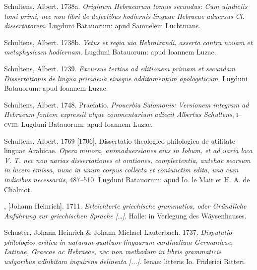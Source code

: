\begin{styleStandard}
Schultens, Albert. 1738a. \textit{Originum Hebraearum tomus secundus: Cum uindiciis tomi primi, nec non libri de defectibus hodiernis linguae Hebraeae aduersus Cl. dissertatorem}. Lugduni Batauorum: apud Samuelem Luchtmans.
\end{styleStandard}

\begin{styleStandard}
Schultens, Albert. 1738b. \textit{Vetus et regia uia Hebraizandi, asserta contra nouam et metaphysicam hodiernam}. Lugduni Batauorum: apud Ioannem Luzac.
\end{styleStandard}

\begin{styleStandard}
Schultens, Albert. 1739. \textit{Excursus tertius ad editionem primam et secundam Dissertationis de lingua primaeua eiusque additamentum apologeticum}. Lugduni Batauorum: apud Ioannem Luzac.
\end{styleStandard}

\begin{styleStandard}
Schultens, Albert. 1748. Praefatio. \textit{Prouerbia Salomonis: Versionem integram ad Hebraeum fontem expressit atque commentarium adiecit Albertus Schultens}, \textsc{i}–\textsc{cviii}. Lugduni Batauorum: apud Ioannem Luzac.
\end{styleStandard}

\begin{styleStandard}
Schultens, Albert. 1769 [1706]. Dissertatio theologico-philologica de utilitate linguae Arabicae. \textit{Opera minora, animaduersiones eius in Iobum, et ad uaria loca V. T. nec non uarias dissertationes et orationes, complectentia, antehac seorsum in lucem emissa, nunc in unum corpus collecta et coniunctim edita, una cum indicibus necessariis}, 487–510. Lugduni Batauorum: apud Io. le Mair et H. A. de Chalmot.
\end{styleStandard}

\begin{styleStandard}
[Schulze], [Johann Heinrich]. 1711. \textit{Erleichterte griechische grammatica, oder Gründliche Anführung zur griechischen Sprache […]}. Halle: in Verlegung des Wäysenhauses.
\end{styleStandard}

\begin{styleStandard}
Schuster, Johann Heinrich \& Johann Michael Lauterbach. 1737. \textit{Disputatio philologico-critica in naturam quattuor linguarum cardinalium Germanicae, Latinae, Graecae ac Hebraeae, nec non methodum in libris grammaticis uulgaribus adhibitam inquirens delineata [...]}. Ienae: litteris Io. Friderici Ritteri.
\end{styleStandard}


